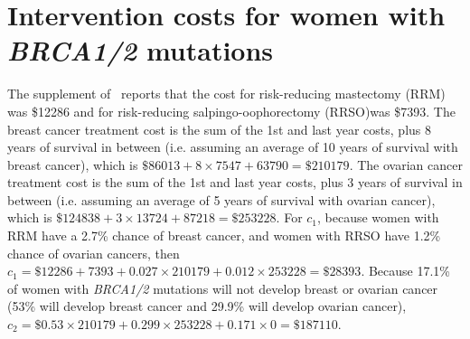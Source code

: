 \documentclass[11pt, letterpaper]{article}
\begin{document}
%



\section{Intervention costs for women with \textit{BRCA1/2} mutations}
\label{sec:TreatmentCostsBRCA}
The supplement of~\cite{Long2015} reports that the cost for risk-reducing mastectomy (RRM) was \$12286 and for risk-reducing salpingo-oophorectomy (RRSO)was \$7393.  The breast cancer treatment cost is the sum of the 1st and last year costs, plus 8 years of survival in between (i.e. assuming an average of 10 years of survival with breast cancer), which is $\$86013+8\times 7547+63790=\$210179$.  The ovarian cancer treatment cost is the sum of the 1st and last year costs, plus 3 years of survival in between (i.e. assuming an average of 5 years of survival with ovarian cancer), which is $\$124838+3\times 13724+87218=\$253228$.    For $c_1$, because women with RRM have a 2.7\% chance of breast cancer, and women with RRSO have 1.2\% chance of ovarian cancers, then $c_1=\$12286+7393 + 0.027\times 210179 + 0.012\times 253228 = \$28393$.  Because 17.1\% of women with \textit{BRCA1/2} mutations will not develop breast or ovarian cancer (53\% will develop breast cancer and 29.9\% will develop ovarian cancer), $c_2=\$0.53\times 210179+0.299\times 253228+ 0.171\times 0 = \$187110$.
\end{document}
